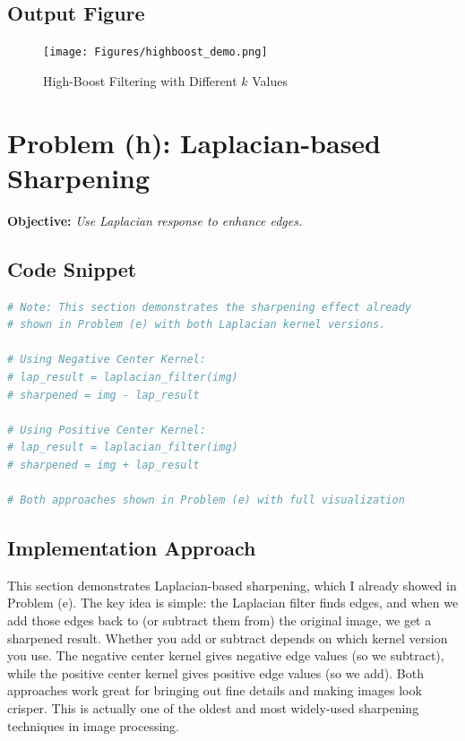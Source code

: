 \documentclass[12pt,a4paper]{report}
\begin{document}
\subsection{Output Figure}
\begin{figure}[H]
\centering
\texttt{[image: Figures/highboost\_demo.png]}
\caption{High-Boost Filtering with Different \(k\) Values}
\end{figure}

\section{Problem (h): Laplacian-based Sharpening}
\textbf{Objective:} \textit{Use Laplacian response to enhance edges.}

\subsection{Code Snippet}
\begin{lstlisting}[language=Python, caption={Laplacian Sharpening}]
# Note: This section demonstrates the sharpening effect already 
# shown in Problem (e) with both Laplacian kernel versions.

# Using Negative Center Kernel:
# lap_result = laplacian_filter(img)
# sharpened = img - lap_result

# Using Positive Center Kernel:
# lap_result = laplacian_filter(img)
# sharpened = img + lap_result

# Both approaches shown in Problem (e) with full visualization
\end{lstlisting}

\subsection{Implementation Approach}
This section demonstrates Laplacian-based sharpening, which I already showed in Problem (e). The key idea is simple: the Laplacian filter finds edges, and when we add those edges back to (or subtract them from) the original image, we get a sharpened result. Whether you add or subtract depends on which kernel version you use. The negative center kernel gives negative edge values (so we subtract), while the positive center kernel gives positive edge values (so we add). Both approaches work great for bringing out fine details and making images look crisper. This is actually one of the oldest and most widely-used sharpening techniques in image processing.
\end{document}
